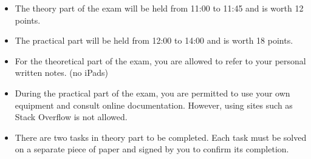 \documentclass{exam}
\begin{document}
\runningheadrule
{}
\firstpagefooter{}{}{}
\runningfooter{}{}{}

\begin{itemize}
    \item The theory part of the exam will be held from 11:00 to 11:45 and is worth 12 points.
    \item The practical part will be held from 12:00 to 14:00  and is worth 18 points.
    \item For the theoretical part of the exam, you are allowed to refer to your personal written notes. (no iPads)
    \item During the practical part of the exam, you are permitted to use your own equipment and consult online documentation. However, using sites such as Stack Overflow is not allowed.
    \item There are two tasks in theory part to be completed. Each task must be solved on a separate piece of paper and signed by you to confirm its completion.
\end{itemize}
\end{document}

